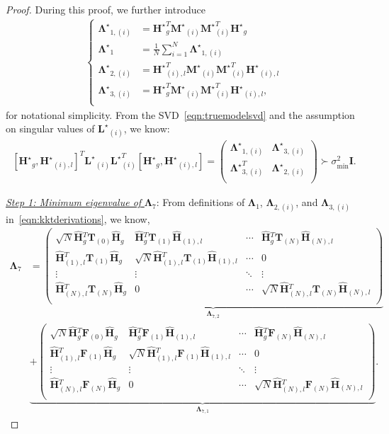 \documentclass[twoside,11pt]{article}
\newcommand{\matF}{\mathbf{F}}
\newcommand{\hmatH}{{\hat{\mathbf{H}}}{}}
\newcommand{\matHst}{{\mathbf{H}^\star}}
\newcommand{\matI}{\mathbf{I}}
\newcommand{\matLst}{{\mathbf{L}^\star}}
\newcommand{\matMst}{{\mathbf{M}^\star}}
\newcommand{\matT}{\mathbf{T}}
\newcommand{\matLambda}{\mathbf{\Lambda}}
\newcommand{\matLambdast}{{\mathbf{\Lambda}^\star}}
\newcommand{\sms}{\sigma_{\min}^2}
\begin{document}
\begin{proof}
 During this proof, we further introduce 
 \begin{align*}
     \left\{\begin{aligned}
    \matLambdast_{1,(i)} &= \matHst_g^T\matMst_{(i)} \matMst_{(i)}^T\matHst_g\\
    \matLambdast_{1} &=\frac{1}{N}\sum_{i=1}^N \matLambdast_{1,(i)}\\
     \matLambdast_{2,(i)} &= \matHst_{(i),l}^T\matMst_{(i)} \matMst_{(i)}^T\matHst_{(i),l}\\
     \matLambdast_{3,(i)} &= \matHst_{g}^T\matMst_{(i)} \matMst_{(i)}^T\matHst_{(i),l},\\\end{aligned}\right. 
 \end{align*}
for notational simplicity. From the SVD~\eqref{eqn:truemodelsvd} and the assumption on singular values of $\matLst_{(i)}$, we know: 
\begin{align}
\label{apeqn:svdimplication}
[\matHst_g,\matHst_{(i),l}]^T\matLst_{(i)}\matLst_{(i)}^T[\matHst_g,\matHst_{(i),l}] =  \begin{pmatrix}
    \matLambdast_{1,(i)} & \matLambdast_{3,(i)}\\
    \matLambdast_{3,(i)}^T&\matLambdast_{2,(i)}\\
   \end{pmatrix} \succ \sms\matI.
\end{align}


\noindent\underline{\textit{Step 1: Minimum eigenvalue of} $\matLambda_7$}: 
From definitions of $\matLambda_1$, $\matLambda_{2,(i)}$, and $\matLambda_{3,(i)}$ in~\eqref{eqn:kktderivations}, we know,
\begin{align*}
   \matLambda_7 &= \underbrace{\begin{pmatrix}
    \sqrt{N}\hmatH_g^T\matT_{(0)}\hmatH_g & \hmatH_g^T\matT_{(1)}\hmatH_{(1),l}&\cdots&\hmatH_g^T\matT_{(N)}\hmatH_{(N),l}\\
    \hmatH_{(1),l}^T\matT_{(1)}\hmatH_g&\sqrt{N}\hmatH_{(1),l}^T\matT_{(1)}\hmatH_{(1),l}&\cdots&0\\
    \vdots&\vdots&\ddots&\vdots\\
    \hmatH_{(N),l}^T\matT_{(N)}\hmatH_g&0&\cdots&\sqrt{N}\hmatH_{(N),l}^T\matT_{(N)}\hmatH_{(N),l}\\
   \end{pmatrix}}_{\matLambda_{7,2}}\\
   &\underbrace{+\begin{pmatrix}
    \sqrt{N}\hmatH_g^T\matF_{(0)}\hmatH_g & \hmatH_g^T\matF_{(1)}\hmatH_{(1),l}&\cdots&\hmatH_g^T\matF_{(N)}\hmatH_{(N),l}\\
    \hmatH_{(1),l}^T\matF_{(1)}\hmatH_g&\sqrt{N}\hmatH_{(1),l}^T\matF_{(1)}\hmatH_{(1),l}&\cdots&0\\
    \vdots&\vdots&\ddots&\vdots\\
    \hmatH_{(N),l}^T\matF_{(N)}\hmatH_g&0&\cdots&\sqrt{N}\hmatH_{(N),l}^T\matF_{(N)}\hmatH_{(N),l}\\
   \end{pmatrix}}_{\matLambda_{7,1}}.
\end{align*}


\end{proof}
\end{document}
